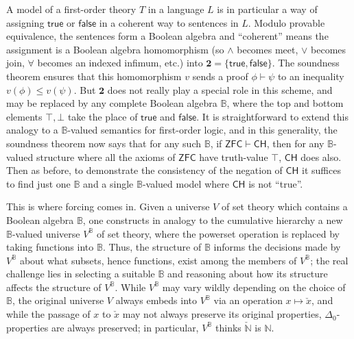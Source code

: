 \documentclass[a4paper,USenglish,cleveref, autoref]{lipics-v2019}
\newcommand{\B}{\mathbb{B}}
\theoremstyle{definition}
\begin{document}
A model of a first-order theory $T$ in a language $L$ is in particular a way of assigning $\mathsf{true}$ or $\mathsf{false}$ in a coherent way to sentences in $L$. Modulo provable equivalence, the sentences form a Boolean algebra and ``coherent'' means the assignment is a Boolean algebra homomorphism (so $\land$ becomes meet, $\lor$ becomes join, $\forall$ becomes an indexed infimum, etc.) into $\mathbf{2} = \{\mathsf{true}, \mathsf{false}\}$. The soundness theorem ensures that this homomorphism $v$ sends a proof $\phi \vdash \psi$ to an inequality $v(\phi) \leq v(\psi)$. But $\mathbf{2}$ does not really play a special role in this scheme, and may be replaced by any complete Boolean algebra $\B$, where the top and bottom elements $\top, \bot$ take the place of $\mathsf{true}$ and $\mathsf{false}$. It is straightforward to extend this analogy to a $\B$-valued semantics for first-order logic, and in this generality, the soundness theorem now says that for any such $\B$, if $\mathsf{ZFC} \vdash \mathsf{CH}$, then for any $\B$-valued structure where all the axioms of $\mathsf{ZFC}$ have truth-value $\top$, $\mathsf{CH}$ does also. Then as before, to demonstrate the consistency of the negation of $\mathsf{CH}$ it suffices to find just one $\mathbb{B}$ and a single $\mathbb{B}$-valued model where $\mathsf{CH}$ is not ``true''.

This is where forcing comes in. Given a universe $V$ of set theory which contains a Boolean algebra $\B$, one constructs in analogy to the cumulative hierarchy a new $\B$-valued universe $V^\B$ of set theory, where the powerset operation is replaced by taking functions into $\B$. Thus, the structure of $\B$ informs the decisions made by $V^\B$ about what subsets, hence functions, exist among the members of $V^\B$; the real challenge lies in selecting a suitable $\B$ and reasoning about how its structure affects the structure of $V^\B$. While $V^\B$ may vary wildly depending on the choice of $\B$, the original universe $V$ always embeds into $V^\B$ via an operation $x \mapsto \check{x}$, and while the passage of $x$ to $\check{x}$ may not always preserve its original properties, $\Delta_0$-properties are always preserved; in particular, $V^\B$ thinks $\check{\mathbb{N}}$ is $\mathbb{N}$.
\end{document}
